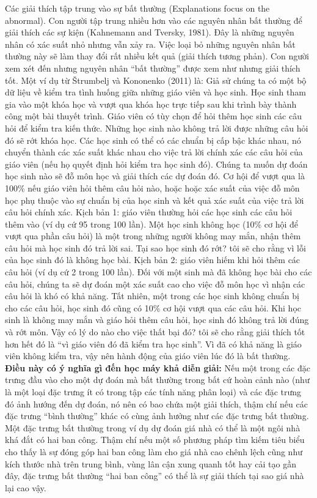 Các giải thích tập trung vào sự bất thường (Explanations focus on the abnormal). Con người tập trung nhiều hơn vào các nguyên nhân bất thường để giải thích các sự kiện (Kahnemann and Tversky, 1981). Đây là những nguyên nhân có xác suất nhỏ nhưng vẫn xảy ra. Việc loại bỏ những nguyên nhân bất thường này sẽ làm thay đổi rất nhiều kết quả (giải thích tương phản). Con người xem xét đến nhưng nguyên nhân “bất thường” được xem như nhưng giải thích tốt. 
Một ví dụ từ Štrumbelj và Kononenko (2011) là: Giả sử chúng ta có một bộ dữ liệu về kiểm tra tình huống giữa những giáo viên và học sinh. Học sinh tham gia vào một khóa học và vượt qua khóa học trực tiếp sau khi trình bày thành công một bài thuyết trình. Giáo viên có tùy chọn để hỏi thêm học sinh các câu hỏi để kiểm tra kiến thức. Những học sinh nào không trả lời được những câu hỏi đó sẽ rớt khóa học. Các học sinh có thể có các chuẩn bị cấp bậc khác nhau, nó chuyển thành các xác suất khác nhau cho việc trả lời chính xác các câu hỏi của giáo viên (nếu họ quyết định hỏi kiểm tra học sinh đó). Chúng ta muốn dự đoán học sinh nào sẽ đỗ môn học và giải thích các dự đoán đó. Cơ hội để vượt qua là 100\% nếu giáo viên hỏi thêm câu hỏi nào, hoặc hoặc xác suất của việc đỗ môn học phụ thuộc vào sự chuẩn bị của học sinh và kết quả xác suất của việc trả lời câu hỏi chính xác.
Kịch bản 1: giáo viên thường hỏi các học sinh các câu hỏi thêm vào (ví dụ cứ 95 trong 100 lần). Một học sinh không học (10\% cơ hội để vượt qua phần câu hỏi) là một trong những người không may mắn, nhận thêm câu hỏi mà học sinh đó trả lời sai. Tại sao học sinh đó rớt? tôi sẽ cho rằng vì lỗi của học sinh đó là không học bài.
Kịch bản 2: giáo viên hiếm khi hỏi thêm các câu hỏi (ví dụ cứ 2 trong 100 lần). Đối với một sinh mà đã không học bài cho các câu hỏi, chúng ta sẽ dự đoán một xác suất cao cho việc đỗ môn học vì nhận các câu hỏi là khó có khả năng. Tất nhiên, một trong các học sinh không chuẩn bị cho các câu hỏi, học sinh đó cũng có 10\% cơ hội vượt qua các câu hỏi. Khi học sinh là không may mắn và giáo hỏi thêm câu hỏi, học sinh đó không trả lời đúng và rớt môn. Vậy có lý do nào cho việc thất bại đó? tôi sẽ cho rằng giải thích tốt hơn hết đó là “vì giáo viên đó đã kiểm tra học sinh”. Vì đã có khả năng là giáo viên không kiểm tra, vậy nên hành động của giáo viên lúc đó là bất thường.
\\\textbf{Điều này có ý nghĩa gì đến học máy khả diễn giải:} Nếu một trong các đặc trưng đầu vào cho một dự đoán mà bất thường trong bất cứ hoàn cảnh nào (như là một loại đặc trưng ít có trong tập các tính năng phân loại) và các đặc trưng đó ảnh hướng đến dự đoán, nó nên có bao chứa một giải thích, thậm chí nếu các đặc trưng “bình thường” khác có cùng ảnh hưởng như các đặc trưng bất thường. Một đặc trưng bất thường trong ví dụ dự đoán giá nhà có thể là một ngôi nhà khá đắt có hai ban công. Thậm chí nếu một số phương pháp tìm kiếm tiêu biểu cho thấy là sự đóng góp hai ban công làm cho giá nhà cao chênh lệch cũng như kích thước nhà trên trung bình, vùng lân cận xung quanh tốt hay cải tạo gần đây, đặc trưng bất thường “hai ban công” có thể là sự giải thích tại sao giá nhà lại cao vậy.
